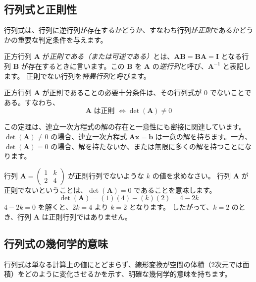 \subsection{行列式と正則性}

行列式は、行列に逆行列が存在するかどうか、すなわち行列が\emph{正則}であるかどうかの重要な判定条件を与えます。

\begin{dfn}[正則行列と特異行列]
正方行列 $\bm{A}$ が\emph{正則である（または可逆である）}とは、$\bm{A}\bm{B} = \bm{B}\bm{A} = \bm{I}$ となる行列 $\bm{B}$ が存在するときに言います。この $\bm{B}$ を $\bm{A}$ の\emph{逆行列}と呼び、$\bm{A}^{-1}$ と表記します。
正則でない行列を\emph{特異行列}と呼びます。
\end{dfn}

\begin{thm}[行列式と正則性の関係]
正方行列 $\bm{A}$ が正則であることの必要十分条件は、その行列式が $0$ でないことである。すなわち、
\[ \bm{A} \text{ は正則 } \iff \det(\bm{A}) \neq 0 \]
\end{thm}

この定理は、連立一次方程式の解の存在と一意性にも密接に関連しています。$\det(\bm{A}) \neq 0$ の場合、連立一次方程式 $\bm{A}\bm{x} = \bm{b}$ は一意の解を持ちます。一方、$\det(\bm{A}) = 0$ の場合、解を持たないか、または無限に多くの解を持つことになります。

\begin{ex}
行列 $\bm{A} = \begin{pmatrix} 1 & k \\ 2 & 4 \end{pmatrix}$ が正則行列でないような $k$ の値を求めなさい。
行列 $\bm{A}$ が正則でないということは、$\det(\bm{A}) = 0$ であることを意味します。
\[ \det(\bm{A}) = (1)(4) - (k)(2) = 4 - 2k \]
$4 - 2k = 0$ を解くと、$2k = 4$ より $k = 2$ となります。
したがって、$k=2$ のとき、行列 $\bm{A}$ は正則行列ではありません。
\end{ex}

\subsection{行列式の幾何学的意味}

行列式は単なる計算上の値にとどまらず、線形変換が空間の体積（2次元では面積）をどのように変化させるかを示す、明確な幾何学的意味を持ちます。


